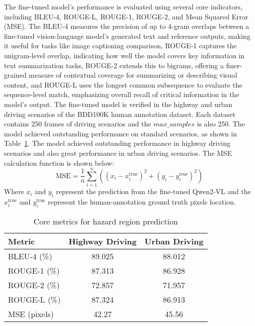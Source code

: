 The fine-tuned model's performance is evaluated using several core indicators, including BLEU-4, ROUGE-L, ROUGE-1, ROUGE-2, and Mean Squared Error (MSE). The BLEU-4 measures the precision of up to 4-gram overlaps between a fine-tuned vision-language model's generated text and reference outputs, making it useful for tasks like image captioning comparison, ROUGE-1 captures the unigram-level overlap, indicating how well the model covers key information in text summarization tasks, ROUGE-2 extends this to bigrams, offering a finer-grained measure of contextual coverage for summarizing or describing visual content, and ROUGE-L uses the longest common subsequence to evaluate the sequence-level match, emphasizing overall recall of critical information in the model’s output. The fine-tuned model is verified in the highway and urban driving scenarios of the BDD100K human annotation dataset. Each dataset contains 250 frames of driving scenarios and the $max \_ samples$ is also 250. The model achieved outstanding performance on standard scenarios, as shown in Table~\ref{tab:core_metrics}. The model achieved outstanding performance in highway driving scenarios and also great performance in urban driving scenarios. The MSE calculation function is shown below:
\begin{equation}
    \text{MSE} = \frac{1}{n} \sum_{i=1}^n \left( (x_i - x_i^{\text{true}})^2 + (y_i - y_i^{\text{true}})^2 \right)
\end{equation}
Where $x_i$ and $y_i$ represent the prediction from the fine-tuned Qwen2-VL and the $x_i^{\text{true}}$ and $y_i^{\text{true}}$ represent the human-annotation ground truth pixels location.
\begin{table}[]
\centering
\caption{Core metrics for hazard region prediction}
\label{tab:core_metrics}
\begin{tabular}{lcc}
\toprule
\textbf{Metric} & \textbf{Highway Driving} & \textbf{Urban Driving}  \\
\midrule
BLEU-4 (\%)     & 89.025 & 88.012    \\
ROUGE-1 (\%)    & 87.313 & 86.928    \\
ROUGE-2 (\%)    & 72.857 & 71.957   \\
ROUGE-L (\%)    & 87.324 & 86.913  \\
MSE (pixels)    & 42.27 & 45.56     \\
\bottomrule
\end{tabular}
\end{table}
